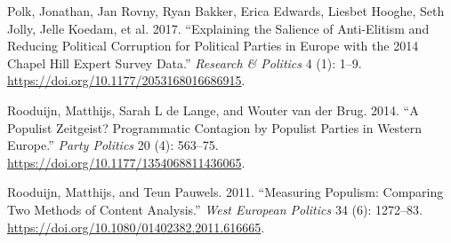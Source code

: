 \documentclass[]{article}
\begin{document}
\leavevmode\hypertarget{ref-polk_explaining_2017}{}%
Polk, Jonathan, Jan Rovny, Ryan Bakker, Erica Edwards, Liesbet Hooghe,
Seth Jolly, Jelle Koedam, et al. 2017. ``Explaining the Salience of
Anti-Elitism and Reducing Political Corruption for Political Parties in
Europe with the 2014 Chapel Hill Expert Survey Data.'' \emph{Research \&
Politics} 4 (1): 1--9. \url{https://doi.org/10.1177/2053168016686915}.

\leavevmode\hypertarget{ref-rooduijn_populist_2014}{}%
Rooduijn, Matthijs, Sarah L de Lange, and Wouter van der Brug. 2014. ``A
Populist Zeitgeist? Programmatic Contagion by Populist Parties in
Western Europe.'' \emph{Party Politics} 20 (4): 563--75.
\url{https://doi.org/10.1177/1354068811436065}.

\leavevmode\hypertarget{ref-rooduijn_measuring_2011}{}%
Rooduijn, Matthijs, and Teun Pauwels. 2011. ``Measuring Populism:
Comparing Two Methods of Content Analysis.'' \emph{West European
Politics} 34 (6): 1272--83.
\url{https://doi.org/10.1080/01402382.2011.616665}.
\end{document}
